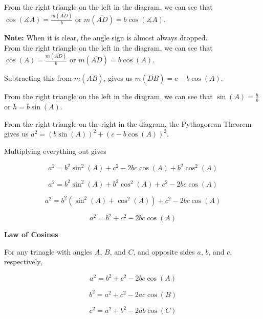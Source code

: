 \documentclass{ximera}
\begin{document}
From the right triangle on the left in the diagram, we can see that $\cos(\measuredangle A) = \frac{m(\overline{AD})}{b}$ or $m(\overline{AD}) = b \cos(\measuredangle A)$. 


\textbf{Note:} When it is clear, the angle sign is almost always dropped. \\


From the right triangle on the left in the diagram, we can see that $\cos(A) = \frac{m(\overline{AD})}{b}$ or $m(\overline{AD}) = b \cos(A)$.


Subtracting this from $m(\overline{AB})$, gives us $m(\overline{DB}) = c - b \cos(A)$.


From the right triangle on the left in the diagram, we can see that $\sin(A) = \frac{h}{b}$ or $h = b \sin(A)$.




From the right triangle on the right in the diagram, the Pythagorean Theorem gives us $a^2 = (b \sin(A))^2 + (c - b \cos(A))^2$.


Multiplying everything out gives


\[    a^2 = b^2 \sin^2(A) +  c^2  - 2 b c \cos(A) + b^2 \cos^2(A)  \]


\[    a^2 = b^2 \sin^2(A) + b^2 \cos^2(A) +  c^2  - 2 b c \cos(A)   \]


\[    a^2 = b^2 (\sin^2(A) + \cos^2(A)) +  c^2  - 2 b c \cos(A)   \]


\[    a^2 = b^2  +  c^2  - 2 b c \cos(A)   \]












\begin{theorem}  \textbf{\textcolor{-red!75!green}{Law of Cosines}}  



For any trinagle with angles $A$, $B$, and $C$, and opposite sides $a$, $b$, and $c$, respectively, 


\[    a^2 = b^2  +  c^2  - 2 b c \cos(A)   \]

\[    b^2 = a^2  +  c^2  - 2 a c \cos(B)   \]

\[    c^2 = a^2  +  b^2  - 2 a b \cos(C)   \]


\end{theorem}
\end{document}
